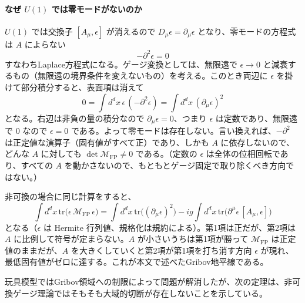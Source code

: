 \documentclass[uplatex, dvipdfmx, book]{jsbook}
\begin{document}
\paragraph{なぜ $U(1)$ では零モードがないのか}
$U(1)$ では交換子 $[A_\mu, \epsilon]$ が消えるので $D_\mu \epsilon = \partial_\mu \epsilon$ となり、零モードの方程式は $A$ によらない
\begin{equation*}
    -\partial^2 \epsilon = 0
\end{equation*}
すなわちLaplace方程式になる。ゲージ変換としては、無限遠で $\epsilon \to 0$ と減衰するもの（無限遠の境界条件を変えないもの）を考える。このとき両辺に $\epsilon$ を掛けて部分積分すると、表面項は消えて
\begin{equation*}
    0 = \int d^dx\, \epsilon\,(-\partial^2 \epsilon) = \int d^dx\, (\partial_\mu \epsilon)^2
\end{equation*}
となる。右辺は非負の量の積分なので $\partial_\mu \epsilon = 0$、つまり $\epsilon$ は定数であり、無限遠で $0$ なので $\epsilon = 0$ である。よって零モードは存在しない。言い換えれば、$-\partial^2$ は正定値な演算子（固有値がすべて正）であり、しかも $A$ に依存しないので、どんな $A$ に対しても $\det \mathcal{M}_{\mathrm{FP}} \neq 0$ である。（定数の $\epsilon$ は全体の位相回転であり、すべての $A$ を動かさないので、もともとゲージ固定で取り除くべき方向ではない。）

非可換の場合に同じ計算をすると、
\begin{equation*}
    \int d^dx\, \mathrm{tr}\bigl(\epsilon\, \mathcal{M}_{\mathrm{FP}}\, \epsilon\bigr) = \int d^dx\, \mathrm{tr}\bigl((\partial_\mu \epsilon)^2\bigr) - ig \int d^dx\, \mathrm{tr}\bigl(\partial^\mu \epsilon\, [A_\mu, \epsilon]\bigr)
\end{equation*}
となる（$\epsilon$ は Hermite 行列値、規格化は規約による）。第1項は正だが、第2項は $A$ に比例して符号が定まらない。$A$ が小さいうちは第1項が勝って $\mathcal{M}_{\mathrm{FP}}$ は正定値のままだが、$A$ を大きくしていくと第2項が第1項を打ち消す方向 $\epsilon$ が現れ、最低固有値がゼロに達する。これが本文で述べたGribov地平線である。

玩具模型ではGribov領域への制限によって問題が解消したが、次の定理\cite{singer1978}は、非可換ゲージ理論ではそもそも大域的切断が存在しないことを示している。
\end{document}
